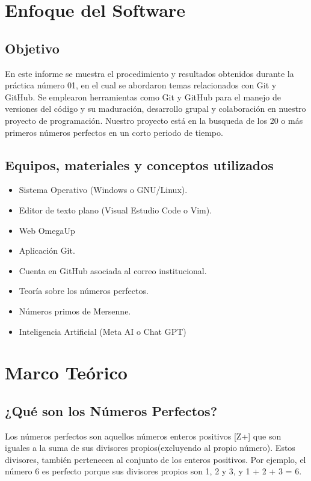 \documentclass{article}
\newcommand{\itemPracticeNumber}{01}
\newcommand{\itemTheme}{Git y GitHub}
\begin{document}
	\vspace{0.5cm}
	\section{Enfoque del Software}
    \subsection{Objetivo}
	En este informe se muestra el procedimiento y resultados obtenidos durante la práctica número \itemPracticeNumber, en el cual se abordaron temas relacionados con \itemTheme. Se emplearon herramientas como Git y GitHub para el manejo de versiones del código y su maduración, desarrollo grupal y colaboración en nuestro proyecto de programación. Nuestro proyecto está en la busqueda de los 20 o más primeros números perfectos en un corto periodo de tiempo.
	\subsection{Equipos, materiales y conceptos utilizados}
    \begin{itemize}
        \item Sistema Operativo (Windows o GNU/Linux).
        \item Editor de texto plano (Visual Estudio Code o Vim).
        \item Web OmegaUp
        \item Aplicación Git.
        \item Cuenta en GitHub asociada al correo institucional.
        \item Teoría sobre los números perfectos.
        \item Números primos de Mersenne.
        \item Inteligencia Artificial (Meta AI o Chat GPT)
    \end{itemize}
    \section{Marco Teórico}
    \subsection{¿Qué son los Números Perfectos?}
    Los números perfectos son aquellos números enteros positivos [Z+] que son iguales a la suma de sus divisores propios(excluyendo al propio número). Estos divisores, también pertenecen al conjunto de los enteros positivos. Por ejemplo, el número 6 es perfecto porque sus divisores propios son 1, 2 y 3, y 1 + 2 + 3 = 6. 
\end{document}
